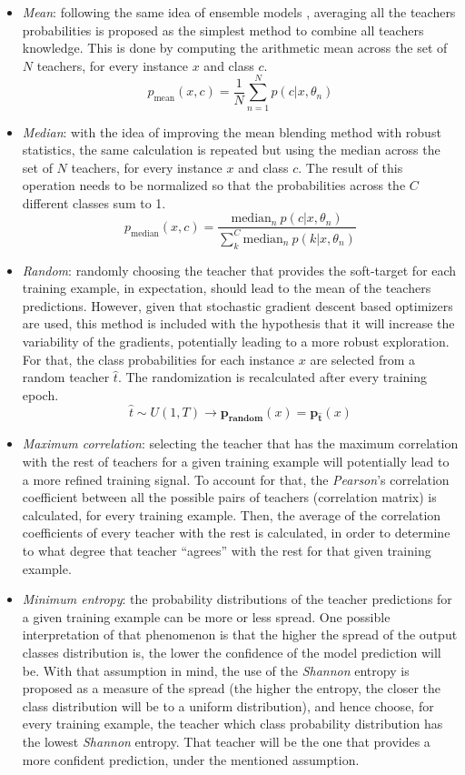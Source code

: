   \begin{itemize}
	  \item \textit{Mean}: following the same idea of ensemble models \autocite{kuncheva2004}, averaging all the teachers probabilities is proposed as the simplest method to combine all teachers knowledge. This is done by computing the arithmetic mean across the set of $N$ teachers, for every instance $x$ and class $c$.
	  $$p_{\text{mean}}(x, c) = \frac{1}{N} \sum_{n=1}^N p(c | x, \theta_n)$$
	  \item \textit{Median}: with the idea of improving the mean blending method with robust statistics, the same calculation is repeated but using the median across the set of $N$ teachers, for every instance $x$ and class $c$. The result of this operation needs to be normalized so that the probabilities across the $C$ different classes sum to 1. $$p_{\text{median}}(x, c) = \frac{\text{median}_n\ p(c | x, \theta_n) }{ \sum_{k}^{C} \text{median}_n\  p(k | x, \theta_n)}  $$
	  \item \textit{Random}: randomly choosing the teacher that provides the soft-target for each training example, in expectation, should lead to the mean of the teachers predictions. However, given that stochastic gradient descent based optimizers are used, this method is included with the hypothesis that it will increase the variability of the gradients, potentially leading to a more robust exploration. For that, the class probabilities for each instance $x$ are selected from a random teacher $\hat{t}$. The randomization is recalculated after every training epoch.
	  $$\hat{t} \sim U(1, T) \rightarrow \mathbf{p_\text{random}}(x) = \mathbf{p_{\hat{t}}}(x)$$
	  \item \textit{Maximum correlation}: selecting the teacher that has the maximum correlation with the rest of teachers for a given training example will potentially lead to a more refined training signal. To account for that, the \textit{Pearson}'s correlation coefficient between all the possible pairs of teachers (correlation matrix) is calculated, for every training example. Then, the average of the correlation coefficients of every teacher with the rest is calculated, in order to determine to what degree that teacher ``agrees'' with the rest for that given training example. 
	  \item \textit{Minimum entropy}: the probability distributions of the teacher predictions for a given training example can be more or less spread. One possible interpretation of that phenomenon is that the higher the spread of the output classes distribution is, the lower the confidence of the model prediction will be. With that assumption in mind, the use of the \textit{Shannon} entropy is proposed as a measure of the spread (the higher the entropy, the closer the class distribution will be to a uniform distribution), and hence choose, for every training example, the teacher which class probability distribution has the lowest \textit{Shannon} entropy. That teacher will be the one that provides a more confident prediction, under the mentioned assumption.
  \end{itemize}

